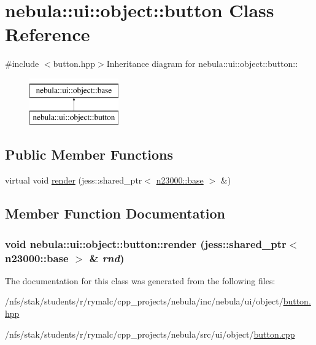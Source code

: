 \hypertarget{classnebula_1_1ui_1_1object_1_1button}{
\section{nebula::ui::object::button Class Reference}
\label{classnebula_1_1ui_1_1object_1_1button}
}


{\ttfamily \#include $<$button.hpp$>$}Inheritance diagram for nebula::ui::object::button::\begin{figure}[H]
\begin{center}
\leavevmode
\includegraphics[height=2cm]{classnebula_1_1ui_1_1object_1_1button}
\end{center}
\end{figure}
\subsection*{Public Member Functions}
\begin{DoxyCompactItemize}
\item 
virtual void \hyperlink{classnebula_1_1ui_1_1object_1_1button_ada386bbb7ea356860b30523627473527}{render} (jess::shared\_\-ptr$<$ \hyperlink{classnebula_1_1platform_1_1renderer_1_1base}{n23000::base} $>$ \&)
\end{DoxyCompactItemize}


\subsection{Member Function Documentation}
\hypertarget{classnebula_1_1ui_1_1object_1_1button_ada386bbb7ea356860b30523627473527}{
\subsubsection[{render}]{\setlength{\rightskip}{0pt plus 5cm}void nebula::ui::object::button::render (jess::shared\_\-ptr$<$ {\bf n23000::base} $>$ \& {\em rnd})}}
\label{classnebula_1_1ui_1_1object_1_1button_ada386bbb7ea356860b30523627473527}


The documentation for this class was generated from the following files:\begin{DoxyCompactItemize}
\item 
/nfs/stak/students/r/rymalc/cpp\_\-projects/nebula/inc/nebula/ui/object/\hyperlink{button_8hpp}{button.hpp}\item 
/nfs/stak/students/r/rymalc/cpp\_\-projects/nebula/src/ui/object/\hyperlink{button_8cpp}{button.cpp}\end{DoxyCompactItemize}
